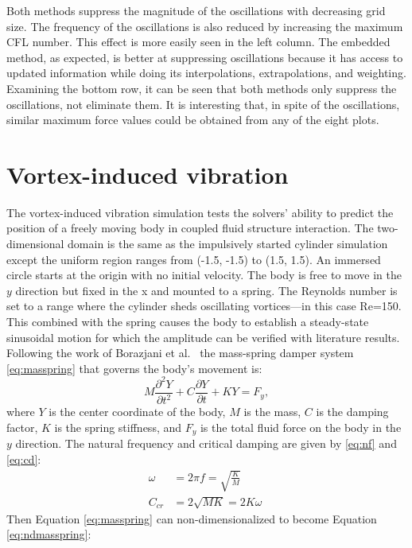 Both methods suppress the magnitude of the oscillations with decreasing grid size. 
The frequency of the oscillations is also reduced by increasing the maximum CFL number. 
This effect is more easily seen in the left column. 
The embedded method, as expected, is better at suppressing oscillations because it has access to updated information while doing its interpolations, extrapolations, and weighting.  
Examining the bottom row, it can be seen that both methods only suppress the oscillations, not eliminate them. 
It is interesting that, in spite of the oscillations, similar maximum force values could be obtained from any of the eight plots. 

\section{Vortex-induced vibration}
The vortex-induced vibration simulation tests the solvers' ability to predict the position of a freely moving body in coupled fluid structure interaction. 
The two-dimensional domain is the same as the impulsively started cylinder simulation except the uniform region ranges from (-1.5, -1.5) to (1.5, 1.5). 
An immersed circle starts at the origin with no initial velocity. 
The body is free to move in the $y$ direction but fixed in the x and mounted to a spring. 
The Reynolds number is set to a range where the cylinder sheds oscillating vortices---in this case Re=150. 
This combined with the spring causes the body to establish a steady-state sinusoidal motion for which the amplitude can be verified with literature results. 
Following the work of Borazjani et al.~\cite{borazjani2008curvilinear} the mass-spring damper system \eqref{eq:masspring} that governs the body's movement is:
\begin{equation}
M\frac{\partial^2Y}{\partial t^2}+C\frac{\partial Y}{\partial t}+KY=F_y, \label{eq:masspring}
\end{equation}
where $Y$ is the center coordinate of the body, $M$ is the mass, $C$ is the damping factor, $K$ is the spring stiffness, and $F_y$ is the total fluid force on the body in the $y$ direction. 
The natural frequency and critical damping are given by \eqref{eq:nf} and \eqref{eq:cd}: 
\begin{align}
\omega &=2\pi f =\sqrt{\frac{K}{M}}\label{eq:nf}\\
C_{cr}&=2\sqrt{MK}=2K\omega \; \label{eq:cd}
\end{align}
Then Equation \eqref{eq:masspring} can non-dimensionalized to become Equation \eqref{eq:ndmasspring}:
